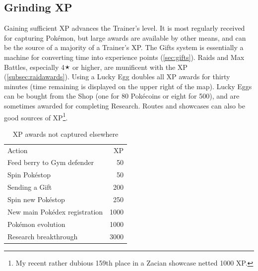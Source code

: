 \subsection{Grinding XP}
\label{subsec:getxp}
Gaining sufficient XP advances the Trainer's level.
It is most regularly received for capturing Pokémon, but large awards are
  available by other means, and can be the source of a majority of a Trainer's XP.
The Gifts system is essentially a machine for converting
  time into experience points (\autoref{sec:gifts}).
Raids and Max Battles, especially 4🟉 or higher, are munificent with the XP (\autoref{subsec:raidawards}).
Using a Lucky Egg doubles all XP awards for thirty minutes (time remaining is displayed on the upper right of the map).
Lucky Eggs can be bought from the Shop (one for 80 Pokécoins or eight for 500),
  and are sometimes awarded for completing Research.
Routes and showcases can also be good sources of XP\footnote{My recent rather dubious 159th place in a Zacian showcase netted 1000 XP\@.}.

\begin{table}
\centering
\begin{tabular}{lr}
Action & XP\\
\Midrule
  Feed berry to Gym defender & 50\\
  Spin Pokéstop & 50\\
  Sending a Gift & 200\\
  Spin new Pokéstop & 250\\
  New main Pokédex registration & 1000\\
  Pokémon evolution & 1000\\
  Research breakthrough & 3000\\
\end{tabular}
\caption{XP awards not captured elsewhere}
\label{table:xpawards}
\end{table}

%

